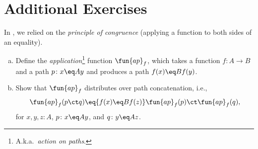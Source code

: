 \section{Additional Exercises}

\begin{exr}\label{exr:ap-application}
    In {\upshape{}}, we relied on the \textsl{principle of congruence} (applying a function to both sides of an equality).
    \begin{enumerate}[a),font=\upshape]
        \item Define the \textsl{application}\footnote{ A.k.a.~\textsl{action on paths}.} function\/ $\fun{ap}_f$, which takes a function\/ $f\colon A\to B$ and a path\/ $p\colon x\eq Ay$ and produces a path\/ $f(x)\eq Bf(y)$.
        
        \item Show that\/ $\fun{ap}_f$ distributes over path concatenation, i.e.,
        \[
            \fun{ap}_f(p\ct q)\eq{f(x)\eq Bf(z)}\fun{ap}_f(p)\ct \fun{ap}_f(q),
        \]
        for\/ $x,y,z\colon A$, $p\colon x\eq Ay$, and\/ $q\colon y\eq Az$.
    \end{enumerate}
\end{exr}

